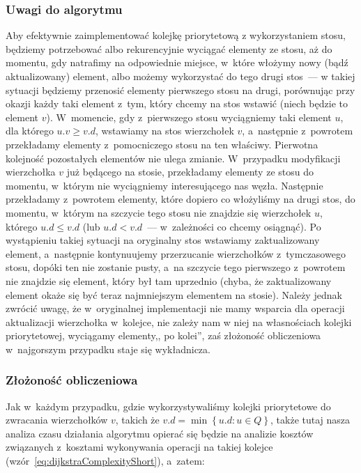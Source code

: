 \subsubsection{Uwagi do algorytmu}


Aby efektywnie zaimplementować kolejkę priorytetową z wykorzystaniem stosu, będziemy potrzebować albo rekurencyjnie wyciągać elementy ze stosu, aż do momentu, gdy natrafimy na odpowiednie miejsce, w~które włożymy nowy (bądź aktualizowany) element, albo możemy wykorzystać do tego drugi stos~--- w takiej sytuacji będziemy przenosić elementy pierwszego stosu na drugi, porównując przy okazji każdy taki element z~tym, który chcemy na stos wstawić (niech będzie to element $v$).
W~momencie, gdy z~pierwszego stosu wyciągniemy taki element $u$, dla którego $u.v \geqslant v.d$, wstawiamy na stos wierzchołek $v$, a~następnie z~powrotem przekładamy elementy z~pomocniczego stosu na ten właściwy.
Pierwotna kolejność pozostałych elementów nie ulega zmianie.
W~przypadku modyfikacji wierzchołka $v$ już będącego na stosie, przekładamy elementy ze stosu do momentu, w~którym nie wyciągniemy interesującego nas węzła.
Następnie przekładamy z~powrotem elementy, które dopiero co włożyliśmy na drugi stos, do momentu, w~którym na szczycie tego stosu nie znajdzie się wierzchołek $u$, którego $u.d \leqslant v.d$ (lub $u.d < v.d$~--- w~zależności co chcemy osiągnąć).
Po wystąpieniu takiej sytuacji na oryginalny stos wstawiamy zaktualizowany element, a~następnie kontynuujemy przerzucanie wierzchołków z~tymczasowego stosu, dopóki ten nie zostanie pusty, a~na szczycie tego pierwszego z~powrotem nie znajdzie się element, który był tam uprzednio (chyba, że zaktualizowany element okaże się być teraz najmniejszym elementem na stosie).
Należy jednak zwrócić uwagę, że w~oryginalnej implementacji nie mamy wsparcia dla operacji aktualizacji wierzchołka w~kolejce, nie zależy nam w niej na własnościach kolejki priorytetowej, wyciągamy elementy,, po kolei'', zaś złożoność obliczeniowa w~najgorszym przypadku staje się wykładnicza.


\subsubsection{Złożoność obliczeniowa}


Jak w~każdym przypadku, gdzie wykorzystywaliśmy kolejki priorytetowe do zwracania wierzchołków $v$, takich że $v.d = \min \left\{ u.d : u \in Q \right\}$, także tutaj nasza analiza czasu działania algorytmu opierać się będzie na analizie kosztów związanych z~kosztami wykonywania operacji na takiej kolejce (wzór~\ref{eq:dijkstraComplexityShort}), a~zatem:

